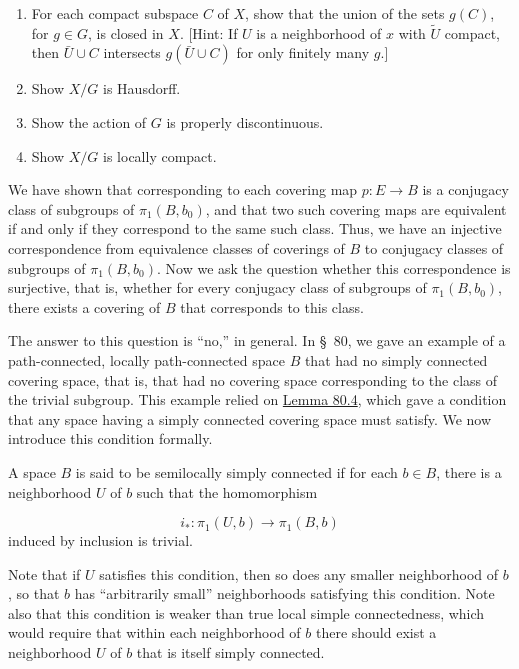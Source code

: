 \begin{enumerate}[itemsep=0.4em, parsep=0pt, topsep=0pt, partopsep=0pt, leftmargin=*, label=\arabic*., ref=\arabic*]
 \begin{enumerate}[itemsep=0.2em, parsep=0pt, topsep=0pt, partopsep=0pt, leftmargin=*, label=(\alph*), align=left]
 \item For each compact subspace \(C\) of \(X\), show that the union of the sets \(g( C)\), for \(g \in G\), is closed in \(X\). [Hint: If \(U\) is a neighborhood of \(x\) with \(\widetilde{U}\) compact, then \(\bar{U} \cup C\) intersects \(g( {\bar{U} \cup C})\) for only finitely many \(g\).]
 \item Show \(X/G\) is Hausdorff.
 \item Show the action of \(G\) is properly discontinuous.
 \item Show \(X/G\) is locally compact.
 \end{enumerate}
\end{enumerate}

We have shown that corresponding to each covering map \(p : E \rightarrow B\) is a conjugacy class of subgroups of \({\pi }_{1}( {B,b_{0}})\), and that two such covering maps are equivalent if and only if they correspond to the same such class. Thus, we have an injective correspondence from equivalence classes of coverings of \(B\) to conjugacy classes of subgroups of \({\pi }_{1}( {B,b_{0}})\). Now we ask the question whether this correspondence is surjective, that is, whether for every conjugacy class of subgroups of \({\pi }_{1}( {B,b_{0}})\), there exists a covering of \(B\) that corresponds to this class.

The answer to this question is ``no,'' in general. In \S\ 80, we gave an example of a path-connected, locally path-connected space \(B\) that had no simply connected covering space, that is, that had no covering space corresponding to the class of the trivial subgroup. This example relied on \hyperref[lem:80.4]{Lemma 80.4}, which gave a condition that any space having a simply connected covering space must satisfy. We now introduce this condition formally.

\begin{definition}
	A space \(B\) is said to be semilocally simply connected if for each \(b \in B\), there is a neighborhood \(U\) of \(b\) such that the homomorphism

\[
i_{ * } : {\pi }_{1}( {U,b}) \rightarrow {\pi }_{1}( {B,b})
\]
induced by inclusion is trivial.
\end{definition}

Note that if \(U\) satisfies this condition, then so does any smaller neighborhood of \(b\), so that \(b\) has ``arbitrarily small'' neighborhoods satisfying this condition. Note also that this condition is weaker than true local simple connectedness, which would require that within each neighborhood of \(b\) there should exist a neighborhood \(U\) of \(b\) that is itself simply connected.

